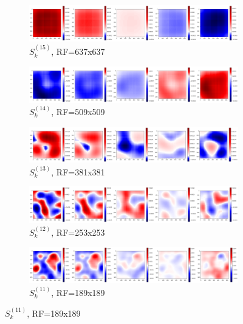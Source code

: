 \documentclass[preprint]{elsarticle}
\theoremstyle{definition} %
\theoremstyle{remark}
\begin{document}
\begin{figure}[h!]
	\centering
	\begin{subfigure}[b]{\textwidth}
		\includegraphics[width=\textwidth]{figures/score_prop_23713_left/score_k637.png}
		\caption{$S_k^{(15)}$, RF=637x637}
		\label{fig:score_k637}
	\end{subfigure}
	
	\begin{subfigure}[b]{\textwidth}
		\includegraphics[width=\textwidth]{figures/score_prop_23713_left/score_k509.png}
		\caption{$S_k^{(14)}$, RF=509x509}
		\label{fig:score_k509}
	\end{subfigure}
	
	\begin{subfigure}[b]{\textwidth}
		\includegraphics[width=\textwidth]{figures/score_prop_23713_left/score_k381.png}
		\caption{$S_k^{(13)}$, RF=381x381}
		\label{fig:score_k381}
	\end{subfigure}

	\begin{subfigure}[b]{\textwidth}
		\includegraphics[width=\textwidth]{figures/score_prop_23713_left/score_k253.png}
		\caption{$S_k^{(12)}$, RF=253x253}
		\label{fig:score_k253}
	\end{subfigure}

	\begin{subfigure}[b]{\textwidth}
		\includegraphics[width=\textwidth]{figures/score_prop_23713_left/score_k189.png}
		\caption{$S_k^{(11)}$, RF=189x189}
		\label{fig:score_k189}
	\end{subfigure}


\end{figure}
\end{document}

